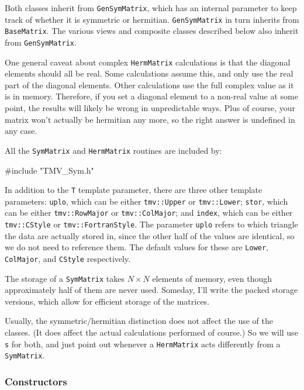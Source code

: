 \documentclass[twoside,letterpaper,11pt]{article}
\renewcommand{\tt}[1]{{\lstinline {#1}}}
\begin{document}
Both classes inherit from \tt{GenSymMatrix},
which has an internal parameter to keep track
of whether it is symmetric or hermitian.
\tt{GenSymMatrix} in turn inherits from \tt{BaseMatrix}.  
The various views and composite classes described below 
also inherit from \tt{GenSymMatrix}.

One general caveat about complex \tt{HermMatrix} calculations is that the diagonal
elements should all be real.  Some calculations assume this, and only 
use the real part of the diagonal elements.  Other calculations use the 
full complex value as it is in memory.  Therefore, if you set a diagonal element 
to a non-real value at some point, the results will likely be wrong in
unpredictable ways.  Plus of course, your matrix won't actually be hermitian any more,
so the right answer is undefined in any case.

All the \tt{SymMatrix} and \tt{HermMatrix} routines are included by:
\begin{tmvcode}
#include "TMV_Sym.h"
\end{tmvcode}

In addition to the \tt{T} template parameter, there are three other template 
parameters: \tt{uplo}, which can be either \tt{tmv::Upper} or \tt{tmv::Lower};
\tt{stor}, which can be either \tt{tmv::RowMajor} or \tt{tmv::ColMajor}; and
\tt{index}, which can be either \tt{tmv::CStyle} or \tt{tmv::FortranStyle}.
The parameter \tt{uplo} refers to which triangle the data are actually stored in, 
since the
other half of the values are identical, so we do not need to reference them.
The default values for these are \tt{Lower}, \tt{ColMajor}, and \tt{CStyle}
respectively.

The storage of a \tt{SymMatrix} takes
$N \times N$ elements of memory, even though approximately half of them 
are never used.  Someday, I'll write the packed storage versions, which allow for
efficient storage of the matrices.

Usually, the symmetric/hermitian distinction does not affect the use of the classes.
(It does affect the actual calculations performed of course.)  So we will use 
\tt{s} for both, and just point out whenever a \tt{HermMatrix} acts differently
from a \tt{SymMatrix}.

\subsubsection{Constructors}
\end{document}
